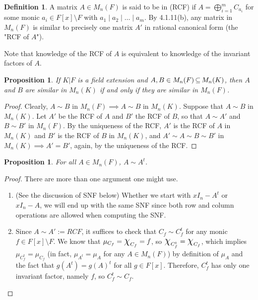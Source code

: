 \documentclass[11pt]{book}
\newcounter{counter}
\newtheorem{proposition}[counter]{Proposition}   \newtheorem{problem}[counter]{Problem}   \newtheorem*{proposition*}{Proposition}   \newtheorem*{lemma*}{Lemma}
\theoremstyle{definition}   \newtheorem{defn}[counter]{Definition} %
\newcommand{\bs}{\setminus}   \newcommand{\A}{\mathcal{A}}   \newcommand{\sy}{\textnormal{Syl}}   \newcommand{\size}[1]{\left| #1 \right|}
\newcommand{\Chi}{\mbox{\Large $\chi$}}
\newcommand{\vs}{\vspace{8pt}}   \newcommand{\hs}{\hspace{8pt}}
\numberwithin{counter}{chapter}
\begin{document}
\vs

\begin{defn}
A matrix $A \in M_n(F)$ is said to be in  (RCF) if $A = \bigoplus_{i=1}^m C_{a_i}$ for some monic $a_i \in F[x]\bs F$ with $a_1 \mid a_2 \mid \dots \mid a_m$. By 4.1.11(b), any matrix in $M_n(F)$ is similar to precisely one matrix $A'$ in rational canonical form  (the "RCF of $A$").
\end{defn}

Note that knowledge of the RCF of $A$ is equivalent to knowledge of the invariant factors of $A$.

\vs

\begin{proposition}
If $K|F$ is a field extension and $A,B \in M_n(F) \operatorname{\subseteq} M_n(K)$, then $A$ and $B$ are similar in $M_n(K)$ if and only if they are similar in $M_n(F)$.
\end{proposition}

\begin{proof}
Clearly, $A \sim B$ in $M_n(F) \implies A \sim B$ in $M_n(K)$. Suppose that $A \sim B$ in $M_n(K)$. Let $A'$ be the RCF of $A$ and $B'$ the RCF of $B$, so that $A \sim A'$ and $B \sim B'$ in $M_n(F)$. By the uniqueness of the RCF, $A'$ is the RCF of $A$ in $M_n(K)$ and $B'$ is the RCF of $B$ in $M_n(K)$, and $A' \sim A \sim B \sim B'$ in $M_n(K) \implies A' = B'$, again, by the uniqueness of the RCF.
\end{proof}

\vs

\begin{proposition}
For all $A \in M_n(F)$, $A \sim A^t$.
\end{proposition}

\begin{proof}
 There are more than one argument one might use.
 \begin{enumerate}
 \item[(1)] (See the discussion of SNF below) Whether we start with $xI_n - A^t$ or $xI_n - A$, we will end up with the same SNF since both row and column operations are allowed when computing the SNF.
 \item[(2)] Since $A \sim A' := RCF$, it suffices to check that $C_f \sim C_f^t$ for any monic $f \in F[x]\bs F$. We know that $\mu_{C_f} = \Chi_{C_f} = f$, so $\Chi_{C_f^t} = \Chi_{C_f}$, which implies $\mu_{C_f^t} = \mu_{C_f}$ (in fact, $\mu_{A^t} = \mu_A$ for any $A \in M_n(F)$) by definition of $\mu_A$ and the fact that $g(A^t) = g(A)^t$ for all $g \in F[x]$. Therefore, $C_f^t$ has only one invariant factor, namely $f$, so $C_f^t \sim C_f$.
 \end{enumerate}
\end{proof}
\end{document}
